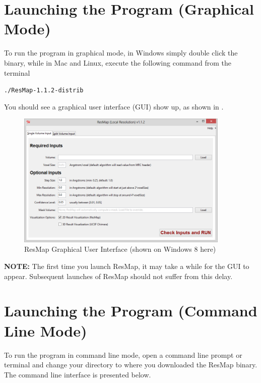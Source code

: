 \documentclass[10pt]{article}
\begin{document}
\section{Launching the Program (Graphical Mode)}
To run the program in graphical mode, in Windows simply double click the binary, while in Mac and Linux, execute the following command from the terminal 
\begin{center}
	\textcolor{NavyBlue}{\texttt{./ResMap-1.1.2-distrib}}
\end{center}

You should see a graphical user interface (GUI) show up, as shown in .
\begin{figure}[!h]
\centering
\includegraphics[width=4in]{img/gui_singleVolume_112.png}
\caption{ResMap Graphical User Interface (shown on Windows 8 here)}
\label{fig:gui_singleVolume}
\end{figure}

\textcolor{RedOrange}{\textbf{NOTE:}} The first time you launch ResMap, it may take a while for the GUI to appear. Subsequent launches of ResMap should not suffer from this delay.

\section{Launching the Program (Command Line Mode)}
To run the program in command line mode, open a command line prompt or terminal and change your directory to where you downloaded the ResMap binary. The command line interface is presented below. 

\medskip
\end{document}
